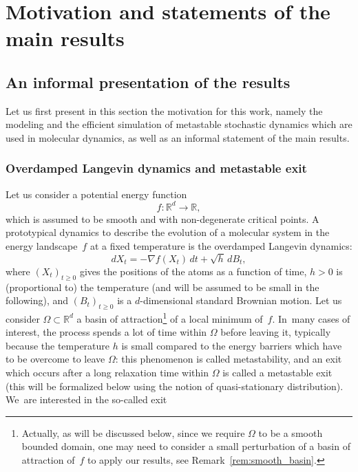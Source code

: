 \section{Motivation and statements of the main results}\label{sec:intro}

\subsection{An informal presentation of the results}\label{sec:informal}

Let us first present in this section the motivation for this work,
namely the modeling and the efficient simulation of metastable
stochastic dynamics which are used in molecular dynamics, as well as
an informal statement of the main results.

\subsubsection*{Overdamped Langevin dynamics and metastable exit} Let us consider a
potential energy function
\[
f:\mathbb R^d \to \mathbb R,
\]
which is assumed to be smooth and with non-degenerate critical points.
A prototypical dynamics to describe the evolution of a molecular
system in the energy landscape~$f$ at a fixed temperature is the
overdamped Langevin dynamics:
\begin{equation}\label{eq.langevin}
dX_t=-\nabla f(X_t) \, dt +\sqrt h \, dB_t,
\end{equation}
where $(X_t)_{t\ge 0}$ gives the positions of the atoms as a function
of time, $h>0$ is (proportional to) the temperature (and will be assumed to be small in the following),
and $(B_t)_{t\ge 0}$ is a $d$-dimensional standard Brownian
motion. Let us consider $\Omega \subset \mathbb R^d$ a basin of
attraction\footnote{\label{fn:1}Actually, as will be discussed below, since we
require $\Omega$ to be a smooth bounded domain, one may need to
consider a small perturbation of a basin of attraction of~$f$ to
apply our results, see Remark~\ref{rem:smooth_basin}.} of a local
minimum of~$f$. In~many cases of interest, the process spends a lot
of time within $\Omega$ before leaving it, typically because
the temperature $h$ is
small compared to the energy barriers which have to be overcome to
leave $\Omega$: this phenomenon is called metastability, and an exit
which occurs after a long relaxation time within $\Omega$ is called a
metastable exit (this will be formalized below using the notion of
quasi-stationary distribution). We~are interested in the so-called exit

